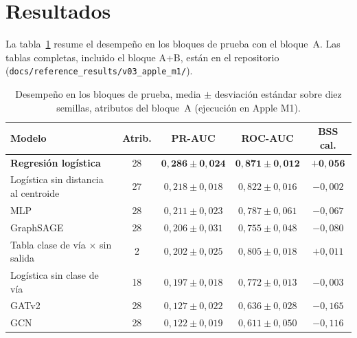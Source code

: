 \documentclass[11pt,a4paper]{article}
\newcommand{\codigo}[1]{\texttt{#1}}
\begin{document}
\section{Resultados}
\label{sec:resultados}

La tabla~\ref{tab:resultados} resume el desempeño en los bloques de prueba con el bloque~A. Las
tablas completas, incluido el bloque A+B, están en el repositorio
(\codigo{docs/reference\_results/v03\_apple\_m1/}).

\begin{table}[H]
  \centering
  \caption{Desempeño en los bloques de prueba, media $\pm$ desviación estándar sobre diez semillas,
  atributos del bloque~A (ejecución en Apple M1).}
  \label{tab:resultados}
  \small
  \begin{tabular}{lcccc}
    \toprule
    Modelo & Atrib. & PR-AUC & ROC-AUC & BSS cal. \\
    \midrule
    \textbf{Regresión logística} & 28 & $\mathbf{0{,}286 \pm 0{,}024}$ & $\mathbf{0{,}871 \pm 0{,}012}$ & $\mathbf{+0{,}056}$ \\
    Logística sin distancia al centroide & 27 & $0{,}218 \pm 0{,}018$ & $0{,}822 \pm 0{,}016$ & $-0{,}002$ \\
    MLP & 28 & $0{,}211 \pm 0{,}023$ & $0{,}787 \pm 0{,}061$ & $-0{,}067$ \\
    GraphSAGE & 28 & $0{,}206 \pm 0{,}031$ & $0{,}755 \pm 0{,}048$ & $-0{,}080$ \\
    Tabla clase de vía $\times$ sin salida & 2 & $0{,}202 \pm 0{,}025$ & $0{,}805 \pm 0{,}018$ & $+0{,}011$ \\
    Logística sin clase de vía & 18 & $0{,}197 \pm 0{,}018$ & $0{,}772 \pm 0{,}013$ & $-0{,}003$ \\
    GATv2 & 28 & $0{,}127 \pm 0{,}022$ & $0{,}636 \pm 0{,}028$ & $-0{,}165$ \\
    GCN & 28 & $0{,}122 \pm 0{,}019$ & $0{,}611 \pm 0{,}050$ & $-0{,}116$ \\
    \bottomrule
  \end{tabular}
\end{table}
\end{document}
